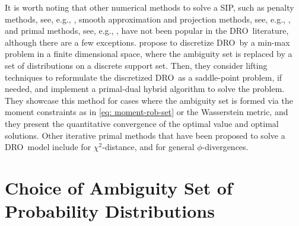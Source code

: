 \documentclass[final,onefignum,onetabnum]{class}
\newcommand{\Bs}[1]{\mathbb{#1}} %
\newcommand{\Cs}[1]{\mathcal{#1}} %
\newcommand{\ol}[1]{\overline{#1}}
\newcommand{\dro}{DRO}
\begin{document}

It is worth noting that other numerical methods to solve a SIP, such as penalty methods, see, e.g.,  \citet{lin2014,yang2016}, smooth approximation and projection methods, see, e.g.,  \citet{xu2014}, and primal methods, see, e.g.,  \citet{wang2015}, have not been  popular in the \dro\ literature, although there are a few exceptions. 
\citet{liu2017primal} propose to discretize  \dro\ by a min-max problem in a finite dimensional space, where the ambiguity set is replaced by a set of  distributions on a discrete support set. %
Then, they consider lifting techniques to reformulate the discretized \dro\ as a saddle-point problem, if needed, and  implement a primal-dual hybrid algorithm to solve the problem. They showcase this method for cases where the ambiguity set is formed via the moment constraints as in \eqref{eq: moment-rob-set} or the Wasserstein metric, and they present the quantitative convergence of the optimal value and  optimal solutions. %
Other iterative primal methods that have been proposed to solve a \dro\ model include \citet{lam2013} for $\chi^{2}$-distance, and \citet{ghosh2018sgd,namkoong2018,ghosh2018} for general $\phi$-divergences. 


\section{Choice of Ambiguity Set of Probability Distributions}
\label{sec: rev.choice.ambiguity}
\end{document}

